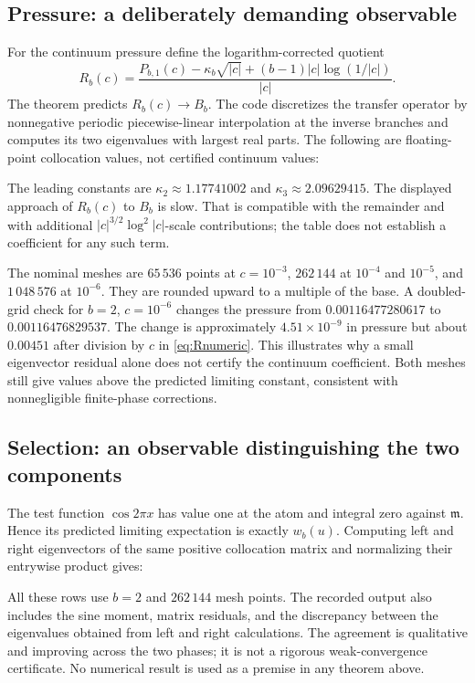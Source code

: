\documentclass[11pt,a4paper]{article}
\numberwithin{equation}{section}
\theoremstyle{definition}
\theoremstyle{remark}
\newcommand{\Leb}{\mathfrak m}
\begin{document}
\subsection{Pressure: a deliberately demanding observable}
For the continuum pressure define the logarithm-corrected quotient
\begin{equation}
 R_b(c)=\frac{P_{b,1}(c)-\kappa_b\sqrt{|c|}
                      +(b-1)|c|\log(1/|c|)}{|c|}.
 \label{eq:Rnumeric}
\end{equation}
The theorem predicts $R_b(c)\to B_b$.
The code discretizes the transfer operator by nonnegative periodic
piecewise-linear interpolation at the inverse branches and computes its
two eigenvalues with largest real parts. The following are floating-point
collocation values, not certified continuum values:
\begin{center}\small\end{center}
The leading constants are $\kappa_2\approx1.17741002$ and
$\kappa_3\approx2.09629415$. The displayed approach of $R_b(c)$ to $B_b$
is slow. That is compatible with the remainder and with additional
$|c|^{3/2}\log^2|c|$-scale contributions; the table does not establish
a coefficient for any such term.

The nominal meshes are $65\,536$ points at $c=10^{-3}$,
$262\,144$ at $10^{-4}$ and $10^{-5}$, and $1\,048\,576$ at $10^{-6}$.
They are rounded upward to a multiple of the base. A doubled-grid check
for $b=2$, $c=10^{-6}$ changes the pressure from
$0.00116477280617$ to $0.00116476829537$.
The change is approximately $4.51\times10^{-9}$ in pressure but about
$0.00451$ after division by $c$ in \cref{eq:Rnumeric}. This illustrates
why a small eigenvector residual alone does not certify the continuum
coefficient. Both meshes still give values above the predicted limiting
constant, consistent with nonnegligible finite-phase corrections.

\subsection{Selection: an observable distinguishing the two components}
The test function $\cos2\pi x$ has value one at the atom and integral
zero against $\Leb$. Hence its predicted limiting expectation is exactly
$w_b(u)$. Computing left and right eigenvectors of the same positive
collocation matrix and normalizing their entrywise product gives:
\begin{center}\small\end{center}
All these rows use $b=2$ and $262\,144$ mesh points. The recorded output
also includes the sine moment, matrix residuals, and the discrepancy
between the eigenvalues obtained from left and right calculations.
The agreement is qualitative and improving across the two phases;
it is not a rigorous weak-convergence certificate. No numerical result
is used as a premise in any theorem above.
\end{document}
